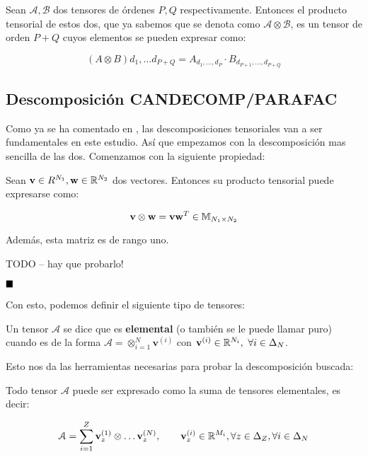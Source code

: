 Sean $\mathcal{A}, \mathcal{B}$ dos tensores de órdenes $P, Q$ respectivamente. Entonces el producto tensorial de estos dos, que ya sabemos que se denota como $\mathcal{A} \otimes \mathcal{B}$, es un tensor de orden $P + Q$ cuyos elementos se pueden expresar como:

$$(A \otimes B)d_1, \ldots d_{P + Q} = A_{d_1, \ldots, d_P} \cdot B_{d_{P + 1}, \ldots, d_{P + Q}}$$

\subsection{Descomposición CANDECOMP/PARAFAC}

Como ya se ha comentado en , las descomposiciones tensoriales van a ser fundamentales en este estudio. Así que empezamos con la descomposición mas sencilla de las dos. Comenzamos con la siguiente propiedad:

\begin{proposicion}
    Sean $\mathbf{v} \in R^{N_1}, \mathbf{w} \in \mathbb{R}^{N_2}$ dos vectores. Entonces su producto tensorial puede expresarse como:

    $$\mathbf{v} \otimes \mathbf{w} = \mathbf{v} \mathbf{w}^T \in \mathbb{M}_{N_1 \times N_2}$$

    Además, esta matriz es de rango uno.
\end{proposicion}

\demostracion

TODO -- hay que probarlo!

$\customqed$

Con esto, podemos definir el siguiente tipo de tensores:

\begin{definicion}
    Un tensor $\mathcal{A}$ se dice que es \textbf{elemental} (o también se le puede llamar puro) cuando es de la forma $\mathcal{A} = \otimes_{i = 1}^N \mathbf{v}^{(i)}$ con $\mathbf{v}^{(i)} \in \mathbb{R}^{N_i},\ \forall i \in \Delta_{N}$.
\end{definicion}

Esto nos da las herramientas necesarias para probar la descomposición buscada:

\begin{proposicion}
    Todo tensor $\mathcal{A}$ puede ser expresado como la suma de tensores elementales, es decir:

    \begin{equation} \label{eq:cp_decomp}
        \mathcal{A} = \sum_{i = 1}^Z \mathbf{v}_z^{(1)} \otimes \ldots \mathbf{v}_z^{(N)},\qquad
        \mathbf{v}_z^{(i)} \in \mathbb{R}^{M_i}, \forall z \in \Delta_{Z}, \forall i \in \Delta_{N}
    \end{equation}

\end{proposicion}

